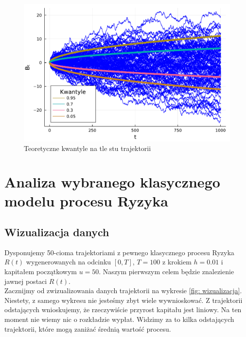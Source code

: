 \documentclass{article}
\theoremstyle{break}
\numberwithin{equation}{subsection}
\numberwithin{figure}{section}
\begin{document}
\begin{figure}[H]
	\center
	\includegraphics[scale=0.35]{kwantyle.pdf}
	\caption{Teoretyczne kwantyle na tle stu trajektorii}
	\label{fig: wiązka_browna}
\end{figure}



\section{Analiza wybranego klasycznego modelu procesu Ryzyka}


\subsection{Wizualizacja danych}

Dysponujemy 50-cioma trajektoriami z pewnego klasycznego procesu Ryzyka $R(t)$ wygenerowanych na odcinku $[0,T]$, $T= 100$ z krokiem $h = 0.01$ i kapitałem początkowym $u=50$. Naszym pierwszym celem będzie znalezienie jawnej postaci $R(t)$.\\
Zacznijmy od zwizualizowania danych trajektorii na wykresie \ref{fig: wizualizacja}. Niestety, z samego wykresu nie jesteśmy zbyt wiele wywnioskować. Z trajektorii odstających wnioskujemy, że rzeczywiście przyrost kapitału jest liniowy. Na ten moment nie wiemy nic o rozkładzie wypłat.
Widzimy za to kilka odstających trajektorii, które mogą zaniżać średnią wartość procesu.
\end{document}
